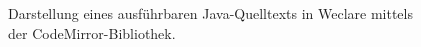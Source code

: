 \begin{figure}[H]
    \centering
    \setlength{\fboxsep}{0pt}
    \setlength{\fboxrule}{0.5pt}
    \caption{Darstellung eines ausführbaren Java-Quelltexts in Weclare mittels der CodeMirror-Bibliothek.}
    \label{abb:weclare_codemirror}
\end{figure}